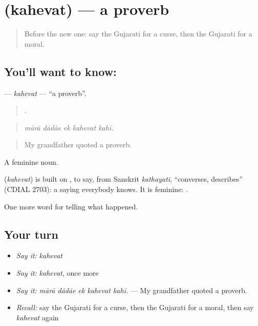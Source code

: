 \section[\texorpdfstring{\gu{કહેવત} (kahevat)}{કહેવત (kahevat)}]{ (kahevat) — a proverb}

\label{lesson:GU-C335-kahevat}



\begin{quote}
Before the new one: say the Gujarati for a curse, then the Gujarati for a moral.
\end{quote}

\subsection*{You'll want to know: }
\textbf{} — \emph{kahevat} — \textquotedblleft{}a proverb\textquotedblright{}.

\begin{quote}
    .
\end{quote}

\begin{quote}
\emph{mārā dādāe ek kahevat kahī.}
\end{quote}

\begin{quote}
My grandfather quoted a proverb.
\end{quote}

A feminine noun.

\begin{cousinweb}
\textbf{} (\emph{kahevat}) is built on \textbf{}, to say, from Sanskrit \emph{kathayati}, \textquotedblleft{}converses, describes\textquotedblright{} (CDIAL 2703): a saying everybody knows. It is feminine: \textbf{  }.
\end{cousinweb}

\begin{grammarlens}[title={What you've built}]
One more word for telling what happened.
\end{grammarlens}

\subsection*{Your turn}
\begin{itemize}
\raggedright
  \item \emph{Say it:} \emph{kahevat}
  \item \emph{Say it:} \emph{kahevat}, once more
  \item \emph{Say it:} \emph{mārā dādāe ek kahevat kahī.} — My grandfather quoted a proverb.
  \item \emph{Recall:} say the Gujarati for a curse, then the Gujarati for a moral, then say \emph{kahevat} again
\end{itemize}

